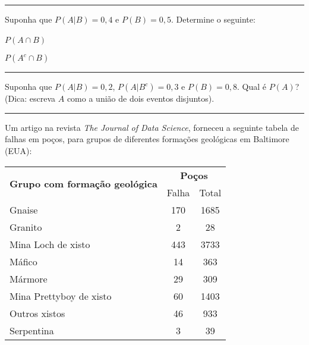 \documentclass[a4paper,11pt,fleqn]{article}\usepackage[]{graphicx}\usepackage[]{color}
\theoremstyle{definition}
\begin{document}
\begin{compactenum}
\vspace{0.3cm}
\hrule
\vspace{0.3cm}

\item Suponha que $P(A|B) = 0,4$ e $P(B) = 0,5$. Determine o seguinte: \\
  \begin{inparaenum}
  \item $P(A \cap B)$ \,
  \item $P(A^c \cap B)$
  \end{inparaenum}

\vspace{0.3cm}
\hrule
\vspace{0.3cm}

\item Suponha que $P(A|B) = 0,2$, $P(A|B^c) = 0,3$ e $P(B) = 0,8$. Qual
  é $P(A)$? (Dica: escreva $A$ como a união de dois eventos disjuntos).

\vspace{0.3cm}
\hrule
\vspace{0.3cm}


\item Um artigo na revista \textit{The Journal of Data Science},
  forneceu a seguinte tabela de falhas em poços, para grupos de
  diferentes formações geológicas em Baltimore (EUA):
  \begin{table}[!h]
    \centering
    \begin{tabular}{lcc}
      \hline
      \multirow{2}{*}{\textbf{Grupo com formação geológica}}
      & \multicolumn{2}{c}{\textbf{Poços}} \\
      \cline{2-3}
                & Falha      & Total  \\
      \hline
      Gnaise     & 170           & 1685           \\
      Granito    & 2           & 28           \\
      Mina Loch de xisto    & 443           & 3733   \\
      Máfico & 14 & 363 \\
      Mármore & 29 & 309 \\
      Mina Prettyboy de xisto & 60 & 1403 \\
      Outros xistos & 46 & 933 \\
      Serpentina & 3 & 39 \\
      \hline
    \end{tabular}
  \end{table}


\end{compactenum}
\end{document}

